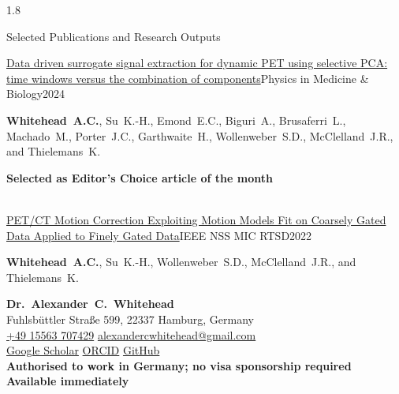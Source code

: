 \documentclass{cv}
\begin{document}
\begin{spacing}{1.8}
\begin{rSection}{Selected Publications and Research Outputs}
            \vspace{-0.5cm}
            \item \begin{rSubsection}{\href{https://doi.org/10.1088/1361-6560/ad5ef1}{Data driven surrogate signal extraction for dynamic PET using selective PCA: time windows versus the combination of components}}{}{Physics in Medicine \& Biology}{2024}
                \vspace{-0.25cm}
                \item \textbf{Whitehead~A.C.}, Su~K.-H., Emond~E.C., Biguri~A., Brusaferri~L., Machado~M., Porter~J.C., Garthwaite~H., Wollenweber~S.D., McClelland~J.R., and Thielemans~K. \\
                \vspace{-0.5cm}
                \item \textbf{Selected as Editor’s Choice article of the month} \\
                \\
            \end{rSubsection}
    
            \vspace{-0.5cm}
            \item \begin{rSubsection}{\href{https://doi.org/10.1109/NSS/MIC44845.2022.10399154}{PET/CT Motion Correction Exploiting Motion Models Fit on Coarsely Gated Data Applied to Finely Gated Data}}{}{IEEE NSS MIC RTSD}{2022}
                \vspace{-0.25cm}
                \item \textbf{Whitehead~A.C.}, Su~K.-H., Wollenweber~S.D., McClelland~J.R., and Thielemans~K.
                \\
            \end{rSubsection}
        \end{rSection}
    \end{spacing}

    \newpage

    \setlength{\parindent}{0pt}

    {\LARGE\textbf{Dr.~Alexander~C.~Whitehead}}\\
    {\small
    Fuhlsbüttler Straße 599, 22337 Hamburg, Germany\\
    \href{tel:+4915563707429}{+49 15563 707429} \textbar{} \href{mailto:alexandercwhitehead@gmail.com}{alexandercwhitehead@gmail.com}\\
    \href{https://scholar.google.com/citations?user=-hH_J28AAAAJ}{Google Scholar}
    \textbar{}
    \href{https://orcid.org/0000-0002-9151-3295}{ORCID}
    \textbar{}
    \href{https://github.com/ALEXJAZZ008008}{GitHub}\\
    \textbf{Authorised to work in Germany; no visa sponsorship required \textbar{} Available immediately}}
    
\end{document}
